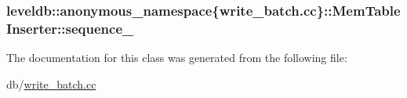 \subsubsection[{sequence\+\_\+}]{ leveldb\+::anonymous\+\_\+namespace\{write\+\_\+batch.\+cc\}\+::Mem\+Table\+Inserter\+::sequence\+\_\+}\label{classleveldb_1_1anonymous__namespace_02write__batch_8cc_03_1_1_mem_table_inserter_a47d59e30dde4a6f569e1bdd173b66ed0}


The documentation for this class was generated from the following file\+:\begin{DoxyCompactItemize}
\item 
db/\hyperlink{write__batch_8cc}{write\+\_\+batch.\+cc}\end{DoxyCompactItemize}
